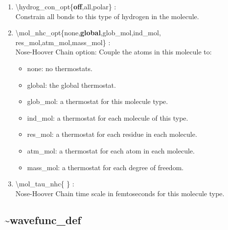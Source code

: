 \documentclass[12pt,titlepage]{article}
\begin{document}
\begin{enumerate}
 \vspace{0.15in} 
 \item  \textbackslash hydrog\_con\_opt\{{\bf off},all,polar\} : \\
   Constrain all bonds to this type of hydrogen in the molecule.

 \vspace{0.15in} 
 \item  \textbackslash mol\_nhc\_opt\{none,{\bf global},glob\_mol,ind\_mol,\\ 
                 \hspace*{0.5in}res\_mol,atm\_mol,mass\_mol\} :  \\
   Nose-Hoover Chain option: Couple the atoms in this molecule to:
      \begin{itemize}
         \item none:     no thermostats.
         \item global:   the global thermostat.
         \item glob\_mol: a thermostat for this molecule type. 
         \item ind\_mol:  a thermostat for each molecule of this type. 
         \item res\_mol:  a thermostat for each residue in each molecule.
         \item atm\_mol:  a thermostat for each atom in each molecule.
         \item mass\_mol: a thermostat for each degree of freedom.
      \end{itemize}

 \vspace{0.15in} 
 \item  \textbackslash mol\_tau\_nhc\{ \} : \\
   Nose-Hoover Chain time scale in femtoseconds for this molecule type.

\end{enumerate}

\newpage
\subsection*{\bf \~{}wavefunc\_def}
\end{document}
